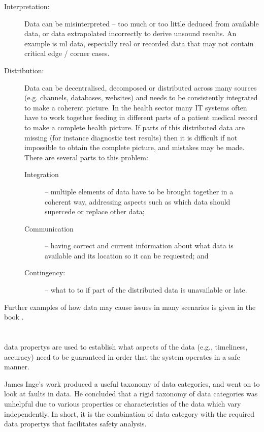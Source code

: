 \begin{description}
	\item[Interpretation:] Data can be misinterpreted -- too much or too little deduced from available data, or data extrapolated incorrectly to derive unsound results.
	An example is \gls{ml} data, especially real or recorded data that may not contain critical edge / corner cases.
	
	\item[Distribution:] Data can be decentralised, decomposed or distributed across many sources (e.g. channels, \glspl{database}, websites) and needs to be consistently integrated to make a coherent picture. In the health sector many IT systems often have to work together feeding in different parts of a patient medical record to make a complete health picture. If parts of this distributed data are missing (for instance diagnostic test results) then it is difficult if not impossible to obtain the complete picture, and mistakes may be made.
	There are several parts to this problem:
	\begin{description}
		\item[Integration] -- multiple elements of data have to be brought together in a coherent way, addressing aspects such as which data should supercede or replace other data;
		\item[Communication] -- having correct and current \gls{information} about what data is available and its location so it can be requested; and
		\item[Contingency:] -- what to to if part of the distributed data is unavailable or late.
	\end{description}
\end{description}


Further examples of how data may cause issues in many scenarios is given in the book  \cite{citation:datacentric}.

\section{}\label{bkm:guidance:dataproperties}
\Glspl{data property} are used to establish what aspects of the data (e.g., \gls{timeliness}, \gls{accuracy}) need to be guaranteed in order that the system operates in a safe manner.

James Inge's work \cite{citation:inge2008improving} produced a useful taxonomy of data categories, and went on to look at faults in data. He concluded that a rigid taxonomy of data categories was unhelpful due to various properties or characteristics of the data which vary independently. In short, it is the combination of data category with the required \glspl{data property} that facilitates safety analysis.

